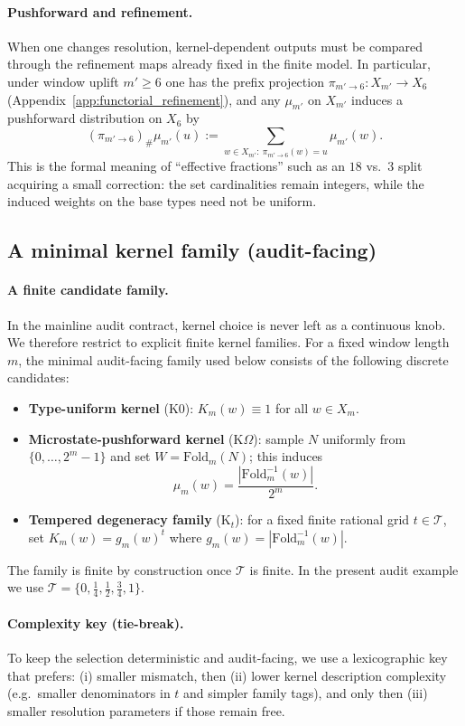 \paragraph{Pushforward and refinement.}
\InterfaceTag When one changes resolution, kernel-dependent outputs must be compared through the refinement maps already fixed in the finite model.
In particular, under window uplift $m'\ge 6$ one has the prefix projection $\pi_{m'\to 6}:X_{m'}\to X_6$ (Appendix~\ref{app:functorial_refinement}), and any $\mu_{m'}$ on $X_{m'}$ induces a pushforward distribution on $X_6$ by
\[
(\pi_{m'\to 6})_\#\mu_{m'}(u):=\sum_{w\in X_{m'}:\ \pi_{m'\to 6}(w)=u}\mu_{m'}(w).
\]
This is the formal meaning of ``effective fractions'' such as an $18$ vs.\ $3$ split acquiring a small correction: the set cardinalities remain integers, while the induced weights on the base types need not be uniform.

\subsection{A minimal kernel family (audit-facing)}
\label{subsec:kernel_family_minimal}

\paragraph{A finite candidate family.}
\AuditTag In the mainline audit contract, kernel choice is never left as a continuous knob.
We therefore restrict to explicit finite kernel families.
For a fixed window length $m$, the minimal audit-facing family used below consists of the following discrete candidates:
\begin{itemize}
\item \textbf{Type-uniform kernel} (\textsf{K0}): $K_m(w)\equiv 1$ for all $w\in X_m$.
\item \textbf{Microstate-pushforward kernel} (\textsf{K$\Omega$}): sample $N$ uniformly from $\{0,\dots,2^m-1\}$ and set $W=\mathrm{Fold}_m(N)$; this induces
\[
\mu_m(w)=\frac{|\mathrm{Fold}_m^{-1}(w)|}{2^m}.
\]
\item \textbf{Tempered degeneracy family} (\textsf{K}$_t$): for a fixed finite rational grid $t\in\mathcal{T}$, set $K_m(w)=g_m(w)^t$ where $g_m(w)=|\mathrm{Fold}_m^{-1}(w)|$.
\end{itemize}
\AuditTag The family is finite by construction once $\mathcal{T}$ is finite.
In the present audit example we use $\mathcal{T}=\{0,\tfrac14,\tfrac12,\tfrac34,1\}$.

\paragraph{Complexity key (tie-break).}
\AuditTag To keep the selection deterministic and audit-facing, we use a lexicographic key that prefers:
(i) smaller mismatch, then (ii) lower kernel description complexity (e.g.\ smaller denominators in $t$ and simpler family tags), and only then (iii) smaller resolution parameters if those remain free.

